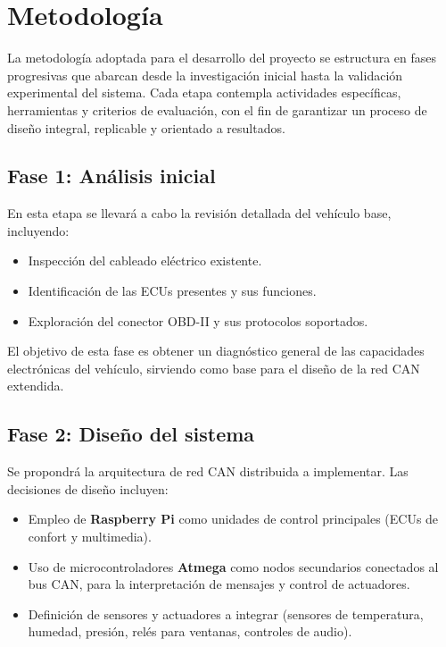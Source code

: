 \section{Metodología}

La metodología adoptada para el desarrollo del proyecto se estructura en fases progresivas que abarcan desde la investigación inicial hasta la validación experimental del sistema. Cada etapa contempla actividades específicas, herramientas y criterios de evaluación, con el fin de garantizar un proceso de diseño integral, replicable y orientado a resultados.

\subsection{Fase 1: Análisis inicial}

En esta etapa se llevará a cabo la revisión detallada del vehículo base, incluyendo:

\begin{itemize}
    \item Inspección del cableado eléctrico existente.
    \item Identificación de las ECUs presentes y sus funciones.
    \item Exploración del conector OBD-II y sus protocolos soportados.
\end{itemize}

El objetivo de esta fase es obtener un diagnóstico general de las capacidades electrónicas del vehículo, sirviendo como base para el diseño de la red CAN extendida.

\subsection{Fase 2: Diseño del sistema}

Se propondrá la arquitectura de red CAN distribuida a implementar. Las decisiones de diseño incluyen:

\begin{itemize}
    \item Empleo de \textbf{Raspberry Pi} como unidades de control principales (ECUs de confort y multimedia).
    \item Uso de microcontroladores \textbf{Atmega} como nodos secundarios conectados al bus CAN, para la interpretación de mensajes y control de actuadores.
    \item Definición de sensores y actuadores a integrar (sensores de temperatura, humedad, presión, relés para ventanas, controles de audio).
\end{itemize}

